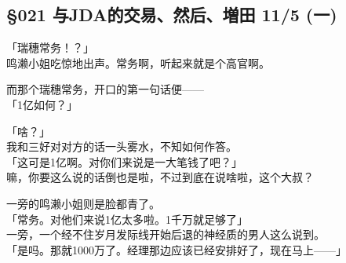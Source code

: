 \subsection{§021 与JDA的交易、然后、増田 11/5 (一)}

「瑞穗常务！？」\\

鸣濑小姐吃惊地出声。常务啊，听起来就是个高官啊。

而那个瑞穗常务，开口的第一句话便——\\

「1亿如何？」

「啥？」\\

我和三好对对方的话一头雾水，不知如何作答。\\

「这可是1亿啊。对你们来说是一大笔钱了吧？」\\

嘛，你要这么说的话倒也是啦，不过到底在说啥啦，这个大叔？

一旁的鸣濑小姐则是脸都青了。\\

「常务。对他们来说1亿太多啦。1千万就足够了」\\

一旁，一个经不住岁月发际线开始后退的神经质的男人这么说到。\\

「是吗。那就1000万了。经理那边应该已经安排好了，现在马上——」

